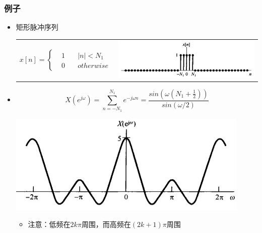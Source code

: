 \documentclass[CJKutf8,dvipsnames,table]{beamer}
\begin{document}
\begin{CJK*}{UTF8}{song}
\begin{frame}
  \end{frame}   
       
  \begin{frame}
    \frametitle{例子}
    \begin{itemize}
    \item 矩形脉冲序列 \\
	\begin{tabular}{ll}
	\raisebox{-.5\height}

    \begin{math}
x[n] = 
\left\{
    \begin {aligned}
         & 1 \quad & |n| < N_1 \\
         & 0 \quad & otherwise                  
    \end{aligned}
\right.
	\end{math}

&
    \includegraphics[valign=m,scale=.4]{ss-c-f5-6a}    \\
    \end{tabular} 
    
    \item
    \[
    X(e^{j\omega}) = \sum_{n=-N_1}^{N_1}e^{-j\omega n} = \frac{sin(\omega (N_1 + \frac{1}{2}))}{sin(\omega /2)}
    \]
    	\begin{center}
    	\includegraphics[scale=.5]{ss-c-f5-6b}
    	\end{center}    
		\begin{itemize}
		\item 注意：低频在$2k\pi$周围，而高频在$(2k+1)\pi$周围
		\end{itemize}
    \end{itemize}


\end{frame}
\end{CJK*}
\end{document}

